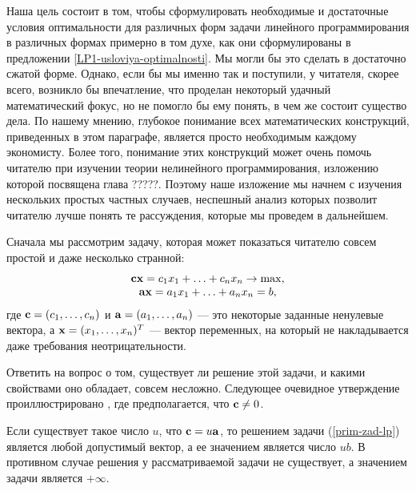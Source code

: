 Наша цель состоит в том, чтобы сформулировать необходимые и достаточные условия оптимальности
для различных форм задачи линейного программирования в различных формах примерно в том духе,
как они сформулированы в предложении \ref{LP1-usloviya-optimalnosti}. Мы могли бы это сделать
в достаточно сжатой форме. Однако, если бы мы именно так и поступили, у читателя, скорее
всего, возникло бы впечатление, что проделан некоторый удачный математический фокус, но не
помогло бы ему понять, в чем же состоит существо дела. По нашему мнению, глубокое понимание
всех математических конструкций, приведенных в этом параграфе, является просто необходимым
каждому экономисту. Более того, понимание этих конструкций может очень помочь читателю при
изучении теории нелинейного программирования, изложению которой посвящена глава ?????.
Поэтому наше изложение мы начнем с изучения нескольких простых частных случаев, неспешный
анализ которых позволит читателю лучше понять те рассуждения, которые мы проведем в
дальнейшем.

    Сначала мы рассмотрим задачу, которая может показаться читателю
    совсем простой и даже несколько странной:
\begin{equation}
   \label{prim-zad-lp}
    \begin{array}{c}
      \mathbf{c}\mathbf{x}=c_{1}x_{1}+\ldots+c_{n}x_{n}\rightarrow\max, \\
      \mathbf{a}\mathbf{x}=a_{1}x_{1}+\ldots+a_{n}x_{n}=b,
    \end{array}
\end{equation}
    где $\mathbf{c}=(c_{1},\ldots,c_{n})$ и $\mathbf{a}=(a_{1},\ldots,a_{n})$ --- это некоторые
    заданные ненулевые вектора, а $\mathbf{x}=(x_{1},\ldots,x_{n})^{T}$ --- вектор
    переменных, на который не накладывается даже требования неотрицательности.

    Ответить на вопрос о том, существует ли решение этой задачи, и
    какими свойствами оно обладает, совсем несложно. Следующее очевидное утверждение
     проиллюстрировано , где предполагается, что $\mathbf{c}\neq0$.

\begin{prop}
    Если существует такое число $u$, что
    $\mathbf{c}=u\mathbf{a}$, то решением задачи (\ref{prim-zad-lp}) является любой допустимый вектор,
    а ее значением является число $ub$. В противном случае решения
    у рассматриваемой задачи не
    существует, а значением задачи является $+\infty$.
\end{prop}

